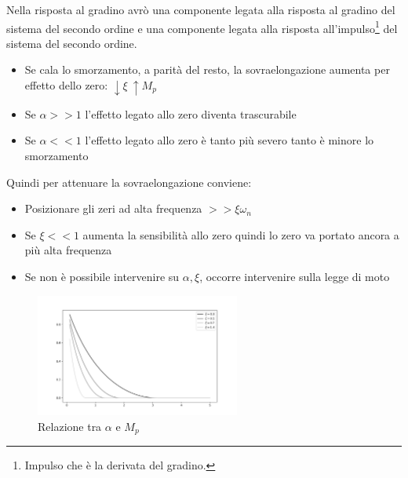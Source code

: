 Nella risposta al gradino avrò una componente legata alla risposta al gradino del sistema del secondo ordine e una componente legata alla risposta all'impulso\footnote{Impulso che è la derivata del gradino.} del sistema del secondo ordine.
\begin{itemize}
    \item Se cala lo smorzamento, a parità del resto, la sovraelongazione aumenta per effetto dello zero: \(\downarrow \xi \ \uparrow M_p\)
    \item Se \(\alpha >>1\) l'effetto legato allo zero diventa trascurabile
    \item Se \(\alpha <<1\) l'effetto legato allo zero è tanto più severo tanto è minore lo smorzamento
\end{itemize}

Quindi per attenuare la sovraelongazione conviene:
\begin{itemize}
    \item Posizionare gli zeri ad alta frequenza \(>> \xi \omega_n\)
    \item Se \(\xi << 1\) aumenta la sensibilità allo zero quindi lo zero va portato ancora  a più alta frequenza
    \item Se non è possibile intervenire su \(\alpha, \xi\), occorre intervenire sulla legge di moto
\end{itemize}

\begin{figure}[h]
    \centering
    \includegraphics[width=0.6\textwidth]{Immagini/relazione_sovraelongazione.png}
    \caption{Relazione tra \(\alpha\) e \(M_p\)}
\end{figure}

